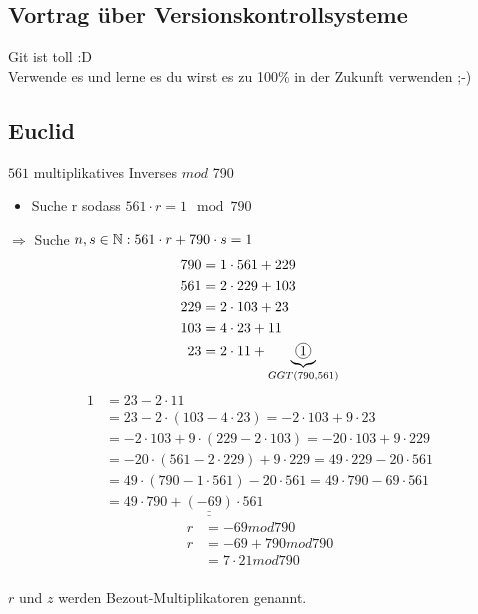 \subsection{Vortrag über Versionskontrollsysteme}
Git ist toll :D\\
Verwende es und lerne es du wirst es zu 100\% in der Zukunft verwenden ;-)

\subsection{Euclid}
$561$ multiplikatives Inverses $mod$ 790\\
\begin{itemize}
    \item Suche r sodass $561 \cdot r = 1 \mod 790$
\end{itemize}
$\Rightarrow$ Suche $n, s \in \mathbb N: 561 \cdot r + 790 \cdot s = 1$\\
\begin{align*}
    790 &= 1 \cdot 561 + 229\\
    561 &= 2 \cdot 229 + 103\\
    229 &= 2 \cdot 103 + 23\\
    103 &= 4 \cdot 23 + 11\\
    23 &= 2 \cdot 11 + \underbrace{\circled{1}}_{GGT(790, 561)}
\end{align*}
\begin{align*}
    1 &= 23 - 2 \cdot 11\\
    &= 23 - 2 \cdot (103 - 4 \cdot 23) = -2 \cdot 103 + 9 \cdot 23\\
    &= - 2 \cdot 103 + 9\cdot (229 - 2 \cdot 103) = -20 \cdot 103 + 9 \cdot 229\\
    &= -20 \cdot (561 - 2 \cdot 229) + 9 \cdot 229 = 49 \cdot 229 - 20 \cdot 561\\
    &= 49 \cdot (790 - 1 \cdot 561) - 20 \cdot 561 = 49 \cdot 790 - 69 \cdot 561\\
    &= 49 \cdot 790 + \underline{\underline{(-69)}} \cdot 561
\end{align*}
\begin{align*}
    r &= -69 mod 790\\
    r &= -69 + 790 mod 790\\
    &= 7 \cdot 21 mod 790\\
\end{align*}

$r$ und $z$ werden Bezout-Multiplikatoren genannt.